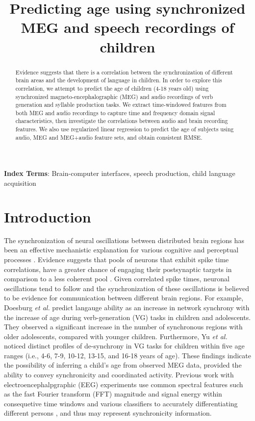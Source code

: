 \documentclass[a4paper]{article}
\title{Predicting age using synchronized MEG and speech recordings of children}
\begin{document}
\maketitle
% 
\begin{abstract}
Evidence suggests that there is a correlation between the synchronization of different brain areas and the development of language in children. In order to explore this correlation, we attempt to predict the age of children (4-18 years old) using synchronized magneto-encephalographic (MEG) and audio recordings of verb generation and syllable production tasks. We extract time-windowed features from both MEG and audio recordings to capture time and frequency domain signal characteristics, then investigate the correlations between audio and brain recording features. We also use regularized linear regression to predict the age of subjects using audio, MEG and MEG+audio feature sets, and obtain consistent RMSE.
\end{abstract}


\noindent\textbf{Index Terms}: Brain-computer interfaces, speech production, child language acquisition

\section{Introduction}

The synchronization of neural oscillations between distributed brain regions has been an effective mechanistic explanation for various cognitive and perceptual processes \cite{Fries2015,Nakasaki1989,NeuralSync}. Evidence suggests that pools of neurons that exhibit spike time correlations, have a greater chance of engaging their postsynaptic targets in comparison to a less coherent pool \cite{NeuralSync}. Given correlated spike times, neuronal oscillations tend to follow and the synchronization of these oscillations is believed to be evidence for communication between different brain regions. For example, Doesburg {\em et al.} \cite{Doesburg2016} predict langauge ability as an increase in network synchrony with the increase of age during verb-generation (VG) tasks in children and adolescents. They observed a significant increase in the number of synchronous regions with older adolescents, compared with younger children. Furthermore, Yu {\em et al.} \cite{Yu2014} noticed distinct profiles of de-synchrony in VG tasks for children within five age ranges (i.e., 4-6, 7-9, 10-12, 13-15, and 16-18 years of age). These findings indicate the possibility of inferring a child's age from observed MEG data, provided the ability to convey synchronicity and coordinated activity.
Previous work with electroencephalpgraphic (EEG) experiments use common spectral features such as the fast Fourier transform (FFT) magnitude and signal energy within consequetive time windows and various classifiers to accurately differentiating different persons \cite{Nguyen2012, Poulos2001}, and thus may represent synchronicity information.
\end{document}
